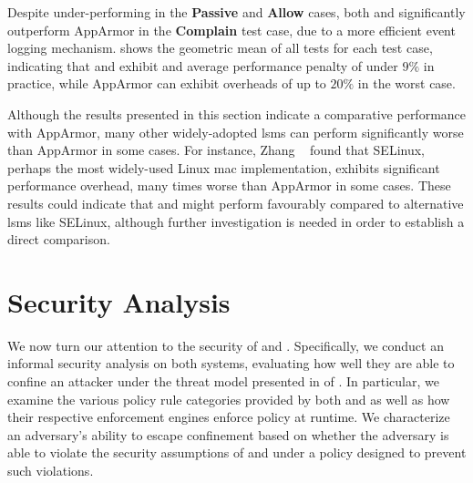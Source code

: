 Despite under-performing in the \textbf{Passive} and \textbf{Allow} cases, both \bpfbox{}
and \bpfcontain{} significantly outperform AppArmor in the \textbf{Complain} test case,
due to a more efficient event logging mechanism.   shows the
geometric mean of all tests for each test case, indicating that \bpfbox{} and
\bpfcontain{} exhibit and average performance penalty of under $9\%$ in practice, while
AppArmor can exhibit overheads of up to $20\%$ in the worst case.

Although the results presented in this section indicate a comparative performance with
AppArmor, many other widely-adopted \glspl{lsm} can perform significantly worse than
AppArmor in some cases. For instance, Zhang \etal~\cite{zhang2021_lsm_file_overhead} found
that SELinux, perhaps the most widely-used Linux \gls{mac} implementation, exhibits
significant performance overhead, many times worse than AppArmor in some cases. These
results could indicate that \bpfbox{} and \bpfcontain{} might perform favourably compared
to alternative \glspl{lsm} like SELinux, although further investigation is needed in order
to establish a direct comparison.

\section{Security Analysis}%
\label{s:eval-security}

We now turn our attention to the security of \bpfbox{} and \bpfcontain. Specifically, we
conduct an informal security analysis on both systems, evaluating how well they are able
to confine an attacker under the threat model presented in  of
. In particular, we examine the various policy rule categories
provided by both \bpfbox{} and \bpfcontain{} as well as how their respective enforcement
engines enforce policy at runtime. We characterize an adversary's ability to escape
confinement based on whether the adversary is able to violate the security assumptions of
\bpfbox{} and \bpfcontain{} under a policy designed to prevent such violations.



